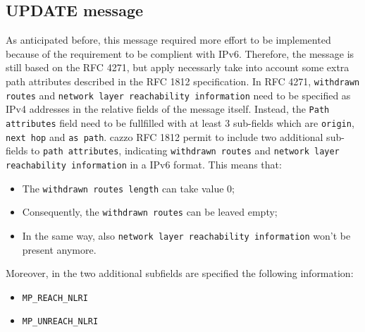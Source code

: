 \subsection{UPDATE message}
As anticipated before, this message required more effort to be implemented because of the requirement to be complient with IPv6. Therefore, the message is still based on the RFC 4271\cite{rfc4271}, but apply necessarly take into account some extra path attributes described in the RFC 1812 specification\cite{rfc1812}.
In RFC 4271, \texttt{withdrawn routes} and \texttt{network layer reachability information} need to be specified as IPv4 addresses in the relative fields of the message itself. Instead, the \texttt{Path attributes} field need to be fullfilled with at least 3 sub-fields which are \texttt{origin}, \texttt{next hop} and \texttt{as path}.
cazzo
RFC 1812 permit to include two additional sub-fields to \texttt{path attributes}, indicating \texttt{withdrawn routes} and \texttt{network layer reachability information} in a IPv6 format.
This means that:
\begin{itemize}
    \item The \texttt{withdrawn routes length} can take value 0;
    \item Consequently, the \texttt{withdrawn routes} can be leaved empty;
    \item In the same way, also \texttt{network layer reachability information} won't be present anymore.
\end{itemize}
Moreover, in the two additional subfields are specified the following information:
\begin{itemize}
    \item \texttt{MP\_REACH\_NLRI} 
    \item \texttt{MP\_UNREACH\_NLRI}
\end{itemize}